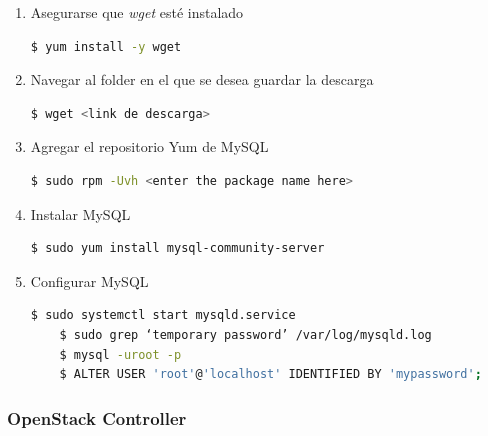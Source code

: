 \documentclass{article}
\begin{document}
\begin{enumerate}
  \item Asegurarse que \emph{wget} est\'e instalado
  \begin{lstlisting}[language=bash]
    $ yum install -y wget
  \end{lstlisting}

  \item Navegar al folder en el que se desea guardar la descarga
  \begin{lstlisting}[language=bash]
    $ wget <link de descarga>
  \end{lstlisting}
  
  \item Agregar el repositorio Yum de MySQL
  \begin{lstlisting}[language=bash]
    $ sudo rpm -Uvh <enter the package name here>
  \end{lstlisting}
  
  \item Instalar MySQL
  \begin{lstlisting}[language=bash]
    $ sudo yum install mysql-community-server
  \end{lstlisting}
  
  \item Configurar MySQL
  \begin{lstlisting}[language=bash]
    $ sudo systemctl start mysqld.service
    $ sudo grep ‘temporary password’ /var/log/mysqld.log
    $ mysql -uroot -p
    $ ALTER USER 'root'@'localhost' IDENTIFIED BY 'mypassword';
  \end{lstlisting}
\end{enumerate}

\subsubsection{OpenStack Controller}
\end{document}
